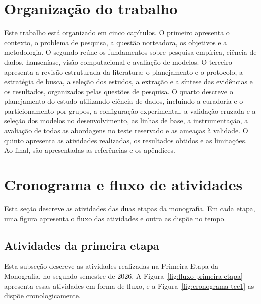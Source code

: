 \section{Organização do trabalho}
\label{sec:organizacao}

Este trabalho está organizado em cinco capítulos. O primeiro apresenta o
contexto, o problema de pesquisa, a questão norteadora, os objetivos e a
metodologia. O segundo reúne os fundamentos sobre pesquisa empírica,
ciência de dados, hanseníase, visão computacional e avaliação de modelos.
O terceiro apresenta a
revisão estruturada da literatura: o planejamento e o protocolo, a estratégia
de busca, a seleção dos estudos, a extração e a síntese das evidências e os
resultados, organizados pelas questões de pesquisa. O quarto descreve o
planejamento do estudo utilizando ciência de dados, incluindo a curadoria e o
particionamento por grupos, a configuração experimental, a validação cruzada
e a seleção dos modelos no desenvolvimento, as linhas de base, a
instrumentação, a avaliação de todas as abordagens no teste reservado e as ameaças à
validade. O quinto apresenta as atividades realizadas, os resultados obtidos e as
limitações. Ao final, são apresentadas as referências e os apêndices.

\section{Cronograma e fluxo de atividades}
\label{sec:cronograma-fluxo}

Esta seção descreve as atividades das duas etapas da monografia. Em cada
etapa, uma figura apresenta o fluxo das atividades e outra as dispõe no
tempo.

\subsection{Atividades da primeira etapa}
\label{subsec:atividades-primeira-etapa}

Esta subseção descreve as atividades realizadas na Primeira Etapa da
Monografia, no segundo semestre de 2026. A
Figura~\ref{fig:fluxo-primeira-etapa} apresenta essas atividades em forma de
fluxo, e a Figura~\ref{fig:cronograma-tcc1} as dispõe cronologicamente.

